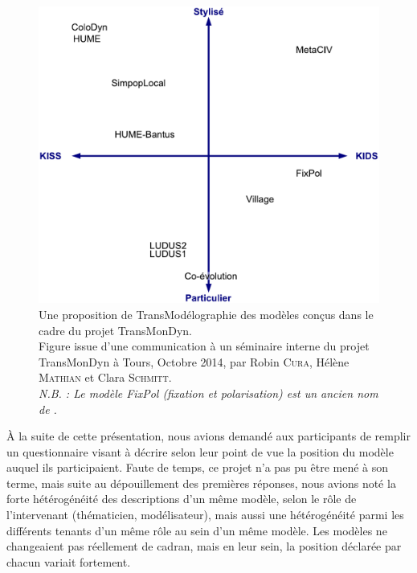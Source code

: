 \begin{figure}[H]
	\centering
	\includegraphics[width=\linewidth]{img/transmodelographie.pdf}
	\caption[Une proposition de \og TransModélographie\fg{}.]{Une proposition de \og TransModélographie\fg{} des modèles conçus dans le cadre du projet TransMonDyn\footnotemark.\\
	Figure issue d'une communication à un séminaire interne du projet TransMonDyn à Tours, Octobre 2014, par Robin \textsc{Cura}, Hélène \textsc{Mathian} et Clara \textsc{Schmitt}.\\
	\textit{N.B. : Le modèle \og FixPol\fg{} (fixation et polarisation) est un ancien nom de \simfeodal{}.}}
	\label{fig:transmodelographie}
\end{figure}

À la suite de cette présentation, nous avions demandé aux participants de remplir un questionnaire visant à décrire selon leur point de vue la position du modèle auquel ils participaient.
Faute de temps, ce projet n'a pas pu être mené à son terme, mais suite au dépouillement des premières réponses, nous avions noté la forte hétérogénéité des descriptions d'un même modèle, selon le rôle de l'intervenant (thématicien, modélisateur), mais aussi une hétérogénéité parmi les différents tenants d'un même rôle au sein d'un même modèle.
Les modèles ne changeaient pas réellement de cadran, mais en leur sein, la position déclarée par chacun variait fortement.


